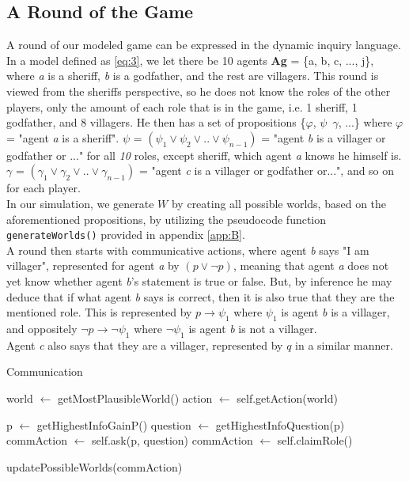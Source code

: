\subsection{A Round of the Game}\label{ARoundOfTheGame}
A round of our modeled game can be expressed in the dynamic inquiry language.
In a model defined as \cref{eq:3}, we let there be 10 agents \textbf{Ag} = \{a,
b, c, ..., j\}, where \textit{a} is a sheriff, \textit{b} is a godfather, and
the rest are villagers. This round is viewed from the sheriffs perspective, so
he does not know the roles of the other players, only the amount of each role
that is in the game, i.e. 1 sheriff, 1 godfather, and 8 villagers. He then has
a set of propositions \{$\varphi$, $\psi$\, $\gamma$, ...\} where $\varphi$ =
"agent \textit{a} is a sheriff". $\psi$ = $(\psi_1 \lor \psi_2 \lor .. \lor
	\psi_{n-1})$ = "agent \textit{b} is a villager or godfather or ..." for all
\textit{10} roles, except sheriff, which agent \textit{a} knows he himself is.
$\gamma$ = $(\gamma_1 \lor \gamma_2 \lor .. \lor \gamma_{n-1}) $ = "agent
\textit{c} is a villager or godfather or...", and so on for each player. \\ In
our simulation, we generate $W$ by creating all possible worlds, based on the
aforementioned propositions, by utilizing the pseudocode function
\lstinline{generateWorlds()} provided in appendix \ref{app:B}. \\ A round then
starts with communicative actions, where agent \textit{b} says "I am villager",
represented for agent \textit{a} by $(p \lor \neg p)$, meaning that agent
\textit{a} does not yet know whether agent \textit{b}'s statement is true or
false. But, by inference he may deduce that if what agent \textit{b} says is
correct, then it is also true that they are the mentioned role. This is
represented by $p \rightarrow \psi_1$ where $\psi_1$ is agent \textit{b} is a
villager, and oppositely $\neg p \rightarrow \neg \psi_1$ where $\neg \psi_1$
is agent \textit{b} is not a villager. \\ Agent \textit{c} also says that they
are a villager, represented by $q$ in a similar manner.

\begin{algorithm}
	\caption{Communication}
	\begin{algorithmic}[1]
		\State world $\gets$ getMostPlausibleWorld()
		\State action $\gets$ self.getAction(world)

		\State p $\gets$ getHighestInfoGainP()
		\State question $\gets$ getHighestInfoQuestion(p)
		\State commAction $\gets$ self.ask(p, question)
		\State commAction $\gets$ self.claimRole()
		\EndIf

		\State updatePossibleWorlds(commAction)
		\EndFunction
	\end{algorithmic}
\end{algorithm}\label{lst:communicate}


